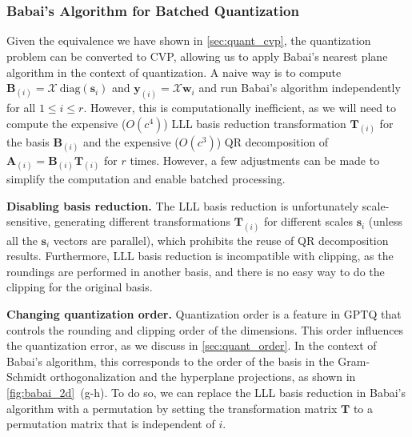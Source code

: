 \documentclass{article} %
\begin{document}
\vspace{-4em}
\renewcommand \thepart{}
\renewcommand \partname{}
\renewcommand{\mtcgapbeforeheads}{0pt}
\renewcommand{\mtcgapafterheads}{0pt}
\part{}
\parttoc[n]

\clearpage

\section{Babai's Algorithm for Batched Quantization}
\label{sec:app_babai_quant_algo}

Given the equivalence we have shown in \cref{sec:quant_cvp}, the quantization problem can be converted to CVP, allowing us to apply Babai's nearest plane algorithm in the context of quantization. A naive way is to compute $\bm{B}_{(i)} = \bm{\mathcal{X}} \mathrm{\ diag} \left( \bm{s}_{i} \right)$ and $\bm{y}_{(i)} = \bm{\mathcal{X}} \bm{w}_{i}$ and run Babai's algorithm independently for all $1 \le i \le r$. However, this is computationally inefficient, as we will need to compute the expensive ($O \left( c^4 \right)$) LLL basis reduction transformation $\bm{T}_{(i)}$ for the basis $\bm{B}_{(i)}$ and the expensive ($O \left( c^3 \right)$) QR decomposition of $\bm{A}_{(i)} = \bm{B}_{(i)} \bm{T}_{(i)}$ for $r$ times. However, a few adjustments can be made to simplify the computation and enable batched processing.

\textbf{Disabling basis reduction.}
The LLL basis reduction is unfortunately scale-sensitive, generating different transformations $\bm{T}_{(i)}$ for different scales $\bm{s}_{i}$ (unless all the $\bm{s}_{i}$ vectors are parallel), which prohibits the reuse of QR decomposition results. Furthermore, LLL basis reduction is incompatible with clipping, as the roundings are performed in another basis, and there is no easy way to do the clipping for the original basis.

\textbf{Changing quantization order.}
Quantization order is a feature in GPTQ that controls the rounding and clipping order of the dimensions. This order influences the quantization error, as we discuss in \cref{sec:quant_order}. In the context of Babai's algorithm, this corresponds to the order of the basis in the Gram-Schmidt orthogonalization and the hyperplane projections, as shown in \cref{fig:babai_2d}~(g-h).
To do so, we can replace the LLL basis reduction in Babai's algorithm with a permutation by setting the transformation matrix $\bm{T}$ to a permutation matrix that is independent of $i$.
\end{document}
